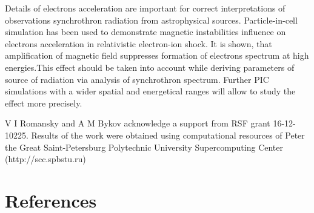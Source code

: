 \documentclass[a4paper]{jpconf}
\begin{document}
	Details of electrons acceleration are important for correct interpretations of observations synchrothron radiation from astrophysical sources. Particle-in-cell simulation has been used to demonstrate magnetic instabilities influence on electrons acceleration in relativistic electron-ion shock. It is shown, that amplification of magnetic field suppresses formation of electrons spectrum at high energies.This effect should be taken into account while deriving parameters of source of radiation via analysis of synchrothron spectrum. Further PIC simulations with a wider spatial and energetical ranges will allow to study the effect more precisely.
	
	
	\ack
	V I Romansky and A M Bykov acknowledge a support from RSF grant 16-12-10225.
	Results of the work were obtained using computational resources of Peter the Great Saint-Petersburg Polytechnic University Supercomputing Center (http://scc.spbstu.ru)
	
	\section*{References}
	

	
\end{document}
